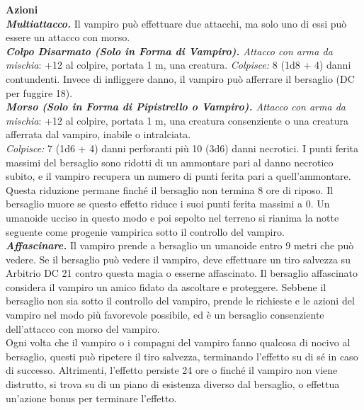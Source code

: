 \begin{multicols}{2}
\smallskip\textbf{Azioni}\\
\emph{\textbf{Multiattacco.}} Il vampiro può effettuare due attacchi, ma solo uno di essi può essere un attacco con morso.\\
\emph{\textbf{Colpo Disarmato (Solo in Forma di Vampiro).} Attacco con arma da mischia}: +12 al colpire, portata 1 m, una creatura. \emph{Colpisce:} 8 (1d8 + 4) danni contundenti. Invece di infliggere danno, il vampiro può afferrare il bersaglio (DC per fuggire 18).\\
\emph{\textbf{Morso (Solo in Forma di Pipistrello o Vampiro).} Attacco con arma da mischia}: +12 al colpire, portata 1 m, una creatura consenziente o una creatura afferrata dal vampiro, inabile o intralciata.\\

\emph{Colpisce:} 7 (1d6 + 4) danni perforanti più 10 (3d6) danni necrotici. I punti ferita massimi del bersaglio sono ridotti di un ammontare pari al danno necrotico subito, e il vampiro recupera un numero di punti ferita pari a quell'ammontare. Questa riduzione permane finché il bersaglio non termina 8 ore di riposo. Il bersaglio muore se questo effetto riduce i suoi punti ferita massimi a 0. Un umanoide ucciso in questo modo e poi sepolto nel terreno si rianima la notte seguente come progenie vampirica sotto il controllo del vampiro. \\

\emph{\textbf{Affascinare.}} Il vampiro prende a bersaglio un umanoide entro 9 metri che può vedere. Se il bersaglio può vedere il vampiro, deve effettuare un tiro salvezza su Arbitrio DC  21 contro questa magia o esserne affascinato. Il bersaglio affascinato considera il vampiro un amico fidato da ascoltare e proteggere. Sebbene il bersaglio non sia sotto il controllo del vampiro, prende le richieste e le azioni del vampiro nel modo più favorevole possibile, ed è un bersaglio consenziente dell'attacco con morso del vampiro.\\

Ogni volta che il vampiro o i compagni del vampiro fanno qualcosa di nocivo al bersaglio, questi può ripetere il tiro salvezza, terminando l'effetto su di sé in caso di successo. Altrimenti, l'effetto persiste 24 ore o finché il vampiro non viene distrutto, si trova su di un piano di esistenza diverso dal bersaglio, o effettua un'azione bonus per terminare l'effetto.\\


\end{multicols}
